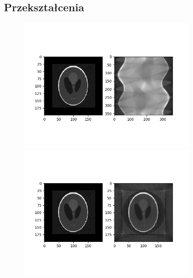 \documentclass{article}
\begin{document}
\subsection{Przekształcenia}
\begin{figure}[H]
\begin{center}
\includegraphics[width=0.8\textwidth]{./phantom/sinogram.jpg}
\includegraphics[width=0.8\textwidth]{./phantom/reconstructedImg2.png}
\end{center}
\end{figure}
\end{document}
